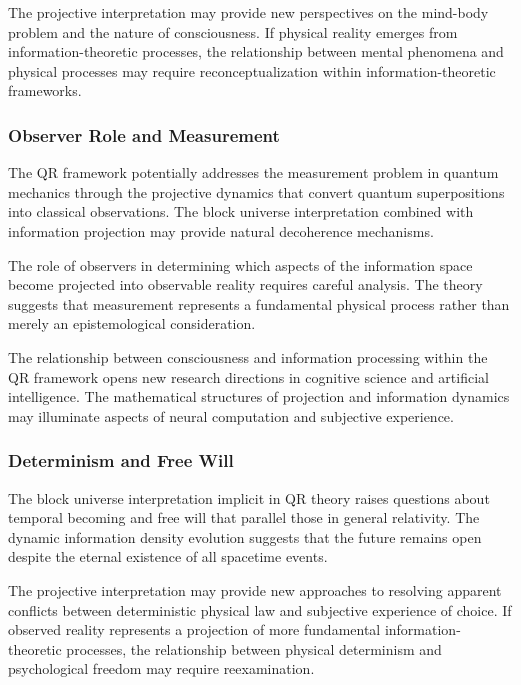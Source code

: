 The projective interpretation may provide new perspectives on the mind-body problem and the nature of consciousness. If physical reality emerges from information-theoretic processes, the relationship between mental phenomena and physical processes may require reconceptualization within information-theoretic frameworks.

\subsubsection{Observer Role and Measurement}
\label{subsubsec:observer-measurement}

The QR framework potentially addresses the measurement problem in quantum mechanics through the projective dynamics that convert quantum superpositions into classical observations. The block universe interpretation combined with information projection may provide natural decoherence mechanisms.

The role of observers in determining which aspects of the information space become projected into observable reality requires careful analysis. The theory suggests that measurement represents a fundamental physical process rather than merely an epistemological consideration.

The relationship between consciousness and information processing within the QR framework opens new research directions in cognitive science and artificial intelligence. The mathematical structures of projection and information dynamics may illuminate aspects of neural computation and subjective experience.

\subsubsection{Determinism and Free Will}
\label{subsubsec:determinism-free-will}

The block universe interpretation implicit in QR theory raises questions about temporal becoming and free will that parallel those in general relativity. The dynamic information density evolution suggests that the future remains open despite the eternal existence of all spacetime events.

The projective interpretation may provide new approaches to resolving apparent conflicts between deterministic physical law and subjective experience of choice. If observed reality represents a projection of more fundamental information-theoretic processes, the relationship between physical determinism and psychological freedom may require reexamination.

